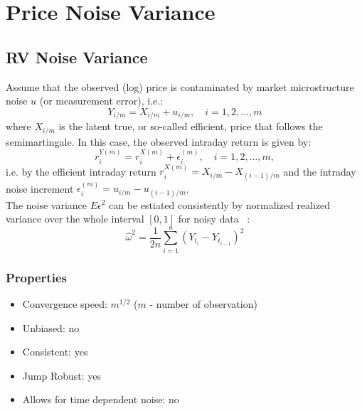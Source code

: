 \documentclass[letterpaper]{report}
\newcounter{N}
\begin{document}
 
\chapter{Price Noise Variance}
\thispagestyle{plain}
\section{RV Noise Variance}
Assume that the observed (log) price is contaminated by market microstructure
noise $u$ (or measurement error), i.e.:
\begin{equation}
Y_{i/m} = X_{i/m} + u_{i/m}, \quad i = 1,2,\ldots, m
\end{equation}
where $X_{i/m}$ is the latent true, or so-called efficient, price that follows
the semimartingale. In this case, the observed intraday return is given
by:
\begin{equation}
r_i^{Y(m)} = r_i^{X(m)} + \epsilon_{i}^{(m)}, \quad i= 1,2,\ldots, m,
\end{equation}
i.e. by the efficient intraday return $r_i^{X(m)} = X_{i/m} - X_{(i-1)/m}$ and the intraday
noise increment $\epsilon_i^{(m)} = u_{i/m} - u_{(i-1)/m}$.\\

\noindent The noise variance $E\epsilon^2$ can be estiated consistently by normalized
realized variance over the whole interval $[0,1]$ for noisy data
~\cite[Zhang et al., 2005]{Zhang_Mykland_Ait-Sahalia}:
\begin{equation}
\label{Noise_Variance}
\hat{\omega}^2=\frac{1}{2n}\sum_{i=1}^{n} (Y_{t_i} - Y_{t_{i-1}})^2
\end{equation}
\subsection{Properties}
\begin{itemize}
\item Convergence speed: $m^{1/2}$ ($m$ - number of observation)
\item Unbiased: no
\item Consistent: yes
\item Jump Robust: yes
\item Allows for time dependent noise: no
\end{itemize}
\end{document}
